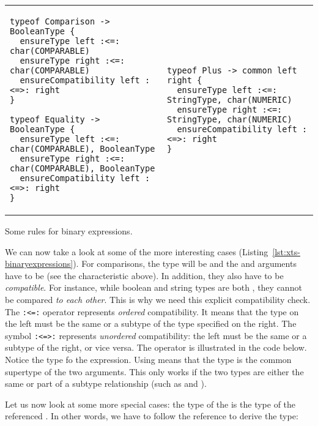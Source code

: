\begin{listing}[tb]
\begin{tabular}{ll}
\begin{lstlisting}[language=xts,boxpos=t] 
typeof Comparison -> BooleanType {
  ensureType left :<=: char(COMPARABLE)
  ensureType right :<=: char(COMPARABLE)
  ensureCompatibility left :<=>: right
}

typeof Equality -> BooleanType {
  ensureType left :<=: char(COMPARABLE), BooleanType
  ensureType right :<=: char(COMPARABLE), BooleanType
  ensureCompatibility left :<=>: right
}
\end{lstlisting}
&
\begin{lstlisting}[language=xts,boxpos=t] 
typeof Plus -> common left right {
  ensureType left :<=: StringType, char(NUMERIC)
  ensureType right :<=: StringType, char(NUMERIC)
  ensureCompatibility left :<=>: right
} 
\end{lstlisting}
\end{tabular}
\vspace{-3.5ex}
\caption{Some rules for binary expressions.}
\label{lst:xts-binaryexpressions}
\end{listing}

We can now take a look at some of the more interesting cases
(Listing~\ref{lst:xts-binaryexpressions}).
For comparisons, the type will be  and the  and  arguments
have to be  (see the characteristic above). In addition, they
also have to be \emph{compatible}. For instance, while boolean and string types are
both , they cannot be compared \emph{to each other}. This is why
we need this explicit compatibility check.
The \verb|:<=:| operator represents \emph{ordered} compatibility. It means that
the type on the left must be the same or a subtype of the type specified on the
right. The symbol \verb|:<=>:| represents \emph{unordered} compatibility: the
left must be the same or a subtype of the right, or vice versa. The operator is
illustrated in the code below. Notice the type fo the  expression.
Using  means that the type is the common supertype of the two
arguments. This only works if the two types are either the same or part of a
subtype relationship (such as  and ).



Let us now look at some more special cases: the type of the 
is the type of the referenced . In other words, we have to follow the 
 reference to derive the type:

